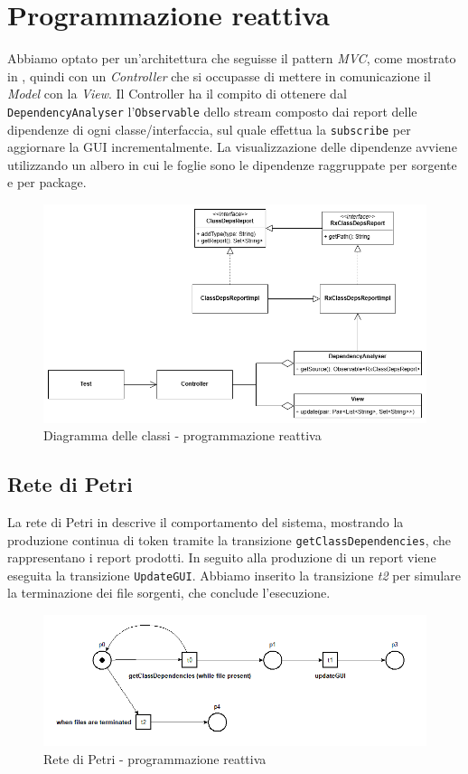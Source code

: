 \documentclass[a4paper,12pt]{report}
\begin{document}
\section{Programmazione reattiva}
Abbiamo optato per un'architettura che seguisse il pattern \textit{MVC}, come mostrato in , quindi con un \textit{Controller} che si occupasse di mettere in comunicazione il \textit{Model} con la \textit{View}.
Il Controller ha il compito di ottenere dal \texttt{DependencyAnalyser} l'\texttt{Observable} dello stream composto dai report delle dipendenze di ogni classe/interfaccia, sul quale effettua la \texttt{subscribe} per aggiornare la GUI incrementalmente.
La visualizzazione delle dipendenze avviene utilizzando un albero in cui le foglie sono le dipendenze raggruppate per sorgente e per package.
\begin{figure}[H]
    \centering
    \includegraphics[width=\linewidth]{figures/class_diagram_reactive.png}
    \caption{\centering Diagramma delle classi - programmazione reattiva}
    \label{fig:class-diagram-reactive}
\end{figure}
\subsection{Rete di Petri}
La rete di Petri in  descrive il comportamento del sistema, mostrando la produzione continua di token tramite la transizione \texttt{getClassDependencies}, che rappresentano i report prodotti. In seguito alla produzione di un report viene eseguita la transizione \texttt{UpdateGUI}. Abbiamo inserito la transizione \textit{t2} per simulare la terminazione dei file sorgenti, che conclude l'esecuzione.
\begin{figure}[H]
    \centering
    \includegraphics[width=\linewidth]{figures/reactive.png}
    \caption{\centering Rete di Petri - programmazione reattiva}
    \label{fig:petri-net-reactive}
\end{figure}
\end{document}
